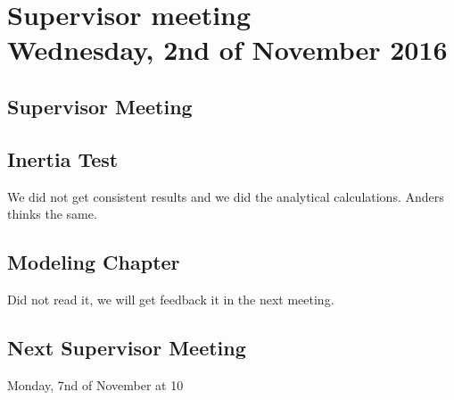 
\renewcommand{\vec}[1]{\boldsymbol{\mathbf{#1}}}

\renewcommand\chaptername{KAPITEL}
\renewcommand\contentsname{Indhold}
\renewcommand\figurename{Figur}
\renewcommand\tablename{Tabel}

\section*{Supervisor meeting\\ \small Wednesday, 2nd of November 2016}
\subsection{Supervisor Meeting}

\subsection{Inertia Test}
	We did not get consistent results and we did the analytical calculations. Anders thinks the same.\\
\subsection{Modeling Chapter}
	Did not read it, we will get feedback it in the next meeting.
\subsection{Next Supervisor Meeting}
Monday, 7nd of November at 10
